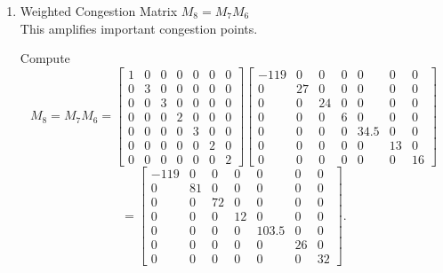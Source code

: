 \documentclass{ximera}
\begin{document}
\begin{enumerate}
    We choose the thresholds:
    \[
    \text{Penalty}=
    \begin{cases}
    1, & \text{if congestion } \leq 0,\\
    2, & \text{if } 0<\text{congestion}\leq 20,\\
    3, & \text{if congestion}>20.
    \end{cases}
    \]

    Thus,
    \[
    M_7=
    \begin{bmatrix}
    1&0&0&0&0&0&0\\
    0&3&0&0&0&0&0\\
    0&0&3&0&0&0&0\\
    0&0&0&2&0&0&0\\
    0&0&0&0&3&0&0\\
    0&0&0&0&0&2&0\\
    0&0&0&0&0&0&2
    \end{bmatrix}.
    \]

    \item Weighted Congestion Matrix $M_8=M_7 M_6$\\
    This amplifies important congestion points.

    Compute
    \[
    M_8=M_7M_6
    =
    \begin{bmatrix}
    1&0&0&0&0&0&0\\
    0&3&0&0&0&0&0\\
    0&0&3&0&0&0&0\\
    0&0&0&2&0&0&0\\
    0&0&0&0&3&0&0\\
    0&0&0&0&0&2&0\\
    0&0&0&0&0&0&2
    \end{bmatrix}
    \begin{bmatrix}
    -119&0&0&0&0&0&0\\
    0&27&0&0&0&0&0\\
    0&0&24&0&0&0&0\\
    0&0&0&6&0&0&0\\
    0&0&0&0&34.5&0&0\\
    0&0&0&0&0&13&0\\
    0&0&0&0&0&0&16
    \end{bmatrix}
    \]
    \[
    =
    \begin{bmatrix}
    -119&0&0&0&0&0&0\\
    0&81&0&0&0&0&0\\
    0&0&72&0&0&0&0\\
    0&0&0&12&0&0&0\\
    0&0&0&0&103.5&0&0\\
    0&0&0&0&0&26&0\\
    0&0&0&0&0&0&32
    \end{bmatrix}.
    \]


\end{enumerate}
\end{document}
